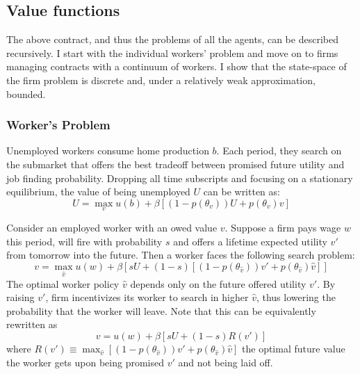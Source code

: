 \subsection{Value functions}
The above contract, and thus the problems of all the agents, can be described recursively. I start with the individual workers' problem and move on to firms managing contracts with a continuum of workers. I show that the state-space of the firm problem is discrete and, under a relatively weak approximation, bounded.
\subsubsection*{Worker's Problem} %
Unemployed workers consume home production $b$. Each period, they search on the submarket that offers the best tradeoff between promised future utility and job finding probability. Dropping all time subscripts and focusing on a stationary equilibrium, the value of being unemployed $U$ can be written as:
\begin{equation} \label{unempproblem}
    U =\max_{v} u(b) + \beta[(1 - p(\theta_v))U + p(\theta_v)v]
\end{equation}

Consider an employed worker with an owed value $v$. Suppose a firm pays wage $w$ this period, will fire with probability $s$ and offers a lifetime expected utility $v'$ from tomorrow into the future. Then a worker faces the following search problem:
\begin{equation} \label{empproblem}
  v=\max_{\hat{v}} u(w) + \beta[sU + (1-s)[(1-p(\theta_{\hat{v}}))v'+p(\theta_{\hat{v}})\hat{v}]]   
\end{equation}
The optimal worker policy $\hat{v}$ depends only on the future offered utility $v'$. By raising $v'$, firm incentivizes its worker to search in higher $\hat{v}$, thus lowering the probability that the worker will leave.
Note that this can be equivalently rewritten as 
\begin{equation*}
  v=u(w) + \beta[sU + (1-s)R(v')]  
\end{equation*}
where $R(v') \equiv \max_{\hat{v}}[(1-p(\theta_{\hat{v}}))v'+p(\theta_{\hat{v}})\hat{v}]$ the optimal future value the worker gets upon being promised $v'$ and not being laid off.
